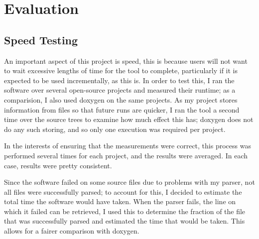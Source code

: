 



\chapter{Evaluation}

\section{Speed Testing}
An important aspect of this project is speed, this is because users will not
want to wait excessive lengths of time for the tool to complete, particularly if
it is expected to be used incrementally, as this is. In order to test this, I
ran the software over several open-source projects and measured their runtime;
as a comparision, I also used doxygen on the same projects. As my project stores
information from files so that future runs are quicker, I ran the tool a second
time over the source trees to examine how much effect this has; doxygen does not
do any such storing, and so only one execution was required per project.

In the interests of ensuring that the measurements were correct, this process
was performed several times for each project, and the results were averaged. In
each case, results were pretty consistent.

Since the software failed on some source files due to problems with my parser,
not all files were successfully parsed; to account for this, I decided to
estimate the total time the software would have taken. When the parser fails,
the line on which it failed can be retrieved, I used this to determine the
fraction of the file that was successfully parsed and estimated the time that
would be taken. This allows for a fairer comparison with doxygen.

